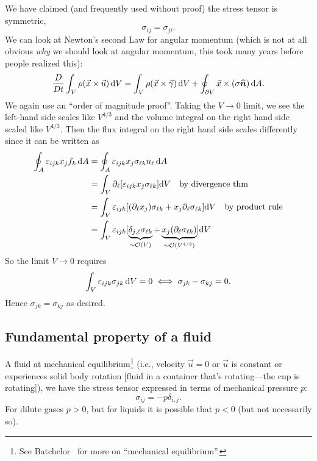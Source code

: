 \begin{node}
We have claimed (and frequently used without proof) the stress tensor
is symmetric,
\begin{equation}
\sigma_{ij}=\sigma_{ji}.
\end{equation}
We can look at Newton's second Law for angular momentum (which is not
at all obvious \emph{why} we should look at angular momentum, this
took many years before people realized this):
\begin{equation}
\frac{D}{Dt}\int_{V}\rho(\vec{x}\times\vec{u})\,\mathrm{d} V
=\int_{V}\rho(\vec{x}\times\vec{\gamma})\,\mathrm{d} V
+\oint_{\partial V}\vec{x}\times(\sigma\widehat{\boldsymbol{n}})\,\mathrm{d} A.
\end{equation}
We again use an ``order of magnitude proof''. Taking the $V\to 0$ limit, 
we see the left-hand side scales like $V^{4/3}$ and the volume
integral on the right hand side scaled like $V^{4/3}$. Then the flux
integral on the right hand side scales differently since it can be
written as
\begin{subequations}
  \begin{align}
\oint_{A}\varepsilon_{ijk}x_{j}f_{k}\,\mathrm{d} A
&=\oint_{A}\varepsilon_{ijk}x_{j}\sigma_{\ell k}n_{\ell}\,\mathrm{d} A\\
&=\int_{V}\partial_{\ell}[\varepsilon_{ijk}x_{j}\sigma_{\ell k}]\mathrm{d} V\quad\mbox{by divergence thm}\\
&=\int_{V}\varepsilon_{ijk}[(\partial_{\ell}x_{j})\sigma_{\ell k}+x_{j}\partial_{\ell}\sigma_{\ell k}]\mathrm{d} V\quad\mbox{by product rule}\\
&=\int_{V}\varepsilon_{ijk}[\underbrace{\delta_{j,\ell}\sigma_{\ell k}}_{\sim\mathcal{O}(V)}+\underbrace{x_{j}(\partial_{\ell}\sigma_{\ell k})}_{\sim\mathcal{O}(V^{4/3})}]\mathrm{d} V
  \end{align}
\end{subequations}
So the limit $V\to 0$ requires
\begin{equation}
\int_{V}\varepsilon_{ijk}\sigma_{jk}\,\mathrm{d} V=0\iff\sigma_{jk}-\sigma_{kj}=0.
\end{equation}
Hence $\sigma_{jk}=\sigma_{kj}$ as desired.
\end{node}

\subsection{Fundamental property of a fluid}

\begin{fact}
A fluid at mechanical equilibrium\footnote{See
  Batchelor~\cite[\S1.3]{batchelor1973introduction} for more on
  ``mechanical equilibrium''.} (i.e., velocity $\vec{u}=0$ or
  $\vec{u}$ is constant or experiences solid body rotation [fluid in a
  container that's rotating---the cup is rotating]), we have the
stress tensor expressed in terms of mechanical pressure $p$:
\begin{equation}
\sigma_{ij}=-p\delta_{i,j}.
\end{equation}
For dilute gases $p>0$, but for liquids it is possible that $p<0$ (but
not necessarily so).
\end{fact}

